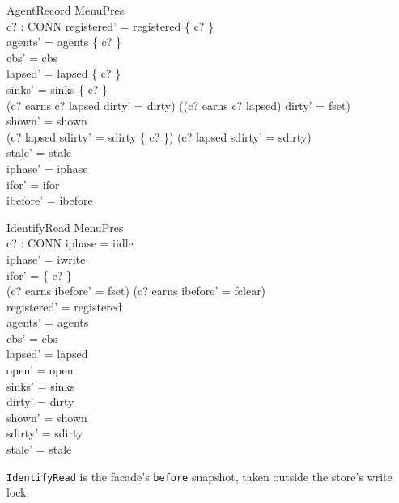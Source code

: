 \documentclass[a4paper,10pt,fleqn]{article}
\begin{document}
\begin{schema}{AgentRecord}
  \Delta MenuPres \\
  c? : CONN
\where
  registered' = registered \cup \{ c? \} \\
  agents' = agents \cup \{ c? \} \\
  cbs' = cbs \\
  lapsed' = lapsed \setminus \{ c? \} \\
  sinks' = sinks \oplus \{ c?  \} \\
  (c? \in earns \land c? \notin lapsed \land dirty' = dirty) \lor
    ((c? \notin earns \lor c? \in lapsed) \land dirty' = fset) \\
  shown' = shown \\
  (c? \in lapsed \land sdirty' = sdirty \cup \{ c? \}) \lor
    (c? \notin lapsed \land sdirty' = sdirty) \\
  stale' = stale \\
  iphase' = iphase \\
  ifor' = ifor \\
  ibefore' = ibefore
\end{schema}

\begin{schema}{IdentifyRead}
  \Delta MenuPres \\
  c? : CONN
\where
  iphase = iidle \\
  iphase' = iwrite \\
  ifor' = \{ c? \} \\
  (c? \in earns \land ibefore' = fset) \lor
    (c? \notin earns \land ibefore' = fclear) \\
  registered' = registered \\
  agents' = agents \\
  cbs' = cbs \\
  lapsed' = lapsed \\
  open' = open \\
  sinks' = sinks \\
  dirty' = dirty \\
  shown' = shown \\
  sdirty' = sdirty \\
  stale' = stale
\end{schema}

\texttt{IdentifyRead} is the facade's \texttt{before} snapshot, taken outside the store's write lock.
\end{document}
